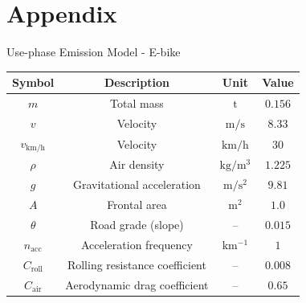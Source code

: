 \documentclass[9pt]{beamer}
\begin{document}
\section{Appendix}

\begin{frame}{Use-phase Emission Model - E-bike}

  \centering
  \begin{tabular}{c c c c}
    \toprule
    \textbf{Symbol} & \textbf{Description} & \textbf{Unit} & \textbf{Value} \\
    \midrule
    $m$ & Total mass & $\mathrm{t}$ & $0.156$ \\
    $v$ & Velocity & $\mathrm{m/s}$ & $8.33$ \\
    $v_{\mathrm{km/h}}$ & Velocity & $\mathrm{km/h}$ & $30$ \\
    $\rho$ & Air density & $\mathrm{kg/m^3}$ & $1.225$ \\
    $g$ & Gravitational acceleration & $\mathrm{m/s^2}$ & $9.81$ \\
    $A$ & Frontal area & $\mathrm{m^2}$ & $1.0$ \\
    $\theta$ & Road grade (slope) & -- & $0.015$ \\
    $n_{\text{acc}}$ & Acceleration frequency & $\mathrm{km^{-1}}$ & $1$ \\
    $C_{\text{roll}}$ & Rolling resistance coefficient & -- & $0.008$ \\
    $C_{\text{air}}$ & Aerodynamic drag coefficient & -- & $0.65$ \\
    \bottomrule
  \end{tabular}
\end{frame}
\end{document}
